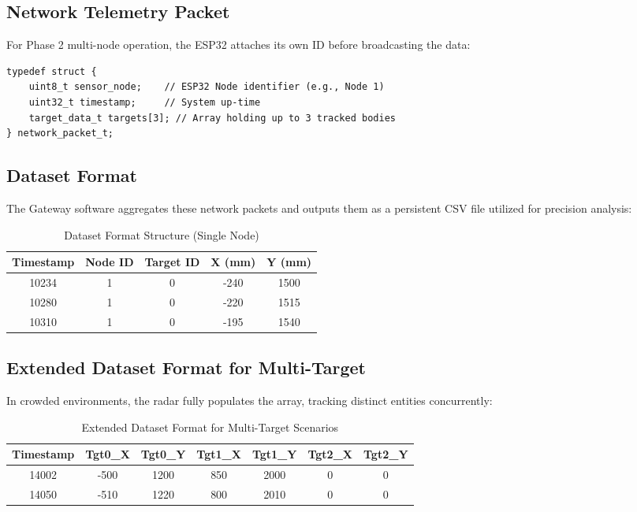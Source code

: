\subsection{Network Telemetry Packet}
\label{subsec:anchor-packet}

For Phase 2 multi-node operation, the ESP32 attaches its own ID before broadcasting the data:

\begin{verbatim}
typedef struct {
    uint8_t sensor_node;    // ESP32 Node identifier (e.g., Node 1)
    uint32_t timestamp;     // System up-time
    target_data_t targets[3]; // Array holding up to 3 tracked bodies
} network_packet_t;
\end{verbatim}

\subsection{Dataset Format}
\label{subsec:dataset-format}

The Gateway software aggregates these network packets and outputs them as a persistent CSV file utilized for precision analysis:

\begin{table}[H]
\centering
\caption{Dataset Format Structure (Single Node)}
\label{tab:dataset-format}
\begin{tabular}{|c|c|c|c|c|}
\hline
\textbf{Timestamp} & \textbf{Node ID} & \textbf{Target ID} & \textbf{X (mm)} & \textbf{Y (mm)} \\
\hline
10234 & 1 & 0 & -240 & 1500 \\
10280 & 1 & 0 & -220 & 1515 \\
10310 & 1 & 0 & -195 & 1540 \\
\hline
\end{tabular}
\end{table}

\subsection{Extended Dataset Format for Multi-Target}
\label{subsec:extended-dataset}

In crowded environments, the radar fully populates the array, tracking distinct entities concurrently:

\begin{table}[H]
\centering
\caption{Extended Dataset Format for Multi-Target Scenarios}
\label{tab:extended-dataset-format}
\begin{tabular}{|c|c|c|c|c|c|c|}
\hline
\textbf{Timestamp} & \textbf{Tgt0\_X} & \textbf{Tgt0\_Y} & \textbf{Tgt1\_X} & \textbf{Tgt1\_Y} & \textbf{Tgt2\_X} & \textbf{Tgt2\_Y} \\
\hline
14002 & -500 & 1200 & 850 & 2000 & 0 & 0 \\
14050 & -510 & 1220 & 800 & 2010 & 0 & 0 \\
\hline
\end{tabular}
\end{table}

